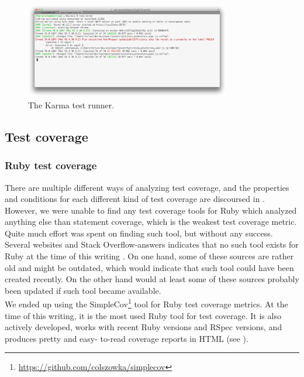 \begin{figure}
\centering
\includegraphics[width=0.8\textwidth]{methodology/karma_runner}
\caption{The Karma test runner.}
\label{fig:karma_runner}
\end{figure}

\subsection{Test coverage}
\label{sec:coverage_frameworks}

\subsubsection{Ruby test coverage}
There are multiple different ways of analyzing test coverage, and the
properties and conditions for each different kind of test coverage are
discoursed in . However, we were unable to find any
test coverage tools for Ruby which analyzed anything else than statement
coverage, which is the weakest test coverage metric. Quite much effort
was spent on finding such tool, but without any success. Several
websites and Stack Overflow-answers indicates that no such tool exists
for Ruby at the time of this writing \cite{web:coverage_ruby19,
so:c1c2_coverage, so:c1_coverage, web:toolbox_code_metrics}. On one
hand, some of these sources are rather old and might be outdated, which
would indicate that such tool could have been created recently. On the
other hand would at least some of these sources probably been updated if
such tool became available.\\

We ended up using the
SimpleCov\footnote{\url{https://github.com/colszowka/simplecov}} tool
for Ruby test coverage metrics. At the time of this writing, it is the
most used Ruby tool for test coverage. It is also actively developed,
works with recent Ruby versions and RSpec versions, and produces pretty
and easy- to-read coverage reports in HTML (see
).\cite{web:toolbox_code_metrics}\\

